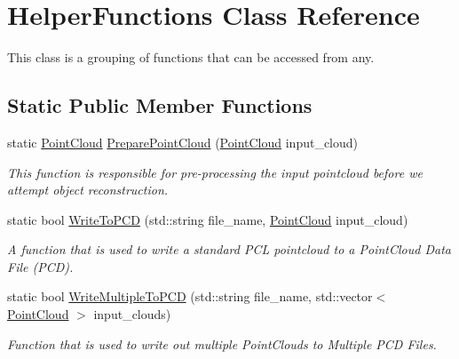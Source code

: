 \hypertarget{class_helper_functions}{\section{\-Helper\-Functions \-Class \-Reference}
\label{class_helper_functions}
}


\-This class is a grouping of functions that can be accessed from any.  


\subsection*{\-Static \-Public \-Member \-Functions}
\begin{DoxyCompactItemize}
\item 
static \hyperlink{_helper_functions_8h_abb956d1047f4dd2c956fe3cb0dd0004d}{\-Point\-Cloud} \hyperlink{class_helper_functions_a2e817646b20092d5f7179ba89635b50f}{\-Prepare\-Point\-Cloud} (\hyperlink{_helper_functions_8h_abb956d1047f4dd2c956fe3cb0dd0004d}{\-Point\-Cloud} input\-\_\-cloud)
\begin{DoxyCompactList}\small\item\em \-This function is responsible for pre-\/processing the input pointcloud before we attempt object reconstruction. \end{DoxyCompactList}\item 
static bool \hyperlink{class_helper_functions_a4b25abbfbd620e9218b2949c758a8872}{\-Write\-To\-P\-C\-D} (std\-::string file\-\_\-name, \hyperlink{_helper_functions_8h_abb956d1047f4dd2c956fe3cb0dd0004d}{\-Point\-Cloud} input\-\_\-cloud)
\begin{DoxyCompactList}\small\item\em \-A function that is used to write a standard \-P\-C\-L pointcloud to a \-Point\-Cloud \-Data \-File (\-P\-C\-D). \end{DoxyCompactList}\item 
static bool \hyperlink{class_helper_functions_a4428222439104c10e58e04958a231c37}{\-Write\-Multiple\-To\-P\-C\-D} (std\-::string file\-\_\-name, std\-::vector$<$ \hyperlink{_helper_functions_8h_abb956d1047f4dd2c956fe3cb0dd0004d}{\-Point\-Cloud} $>$ input\-\_\-clouds)
\begin{DoxyCompactList}\small\item\em \-Function that is used to write out multiple \-Point\-Clouds to \-Multiple \-P\-C\-D \-Files. \end{DoxyCompactList}\item 

\end{DoxyCompactItemize}
